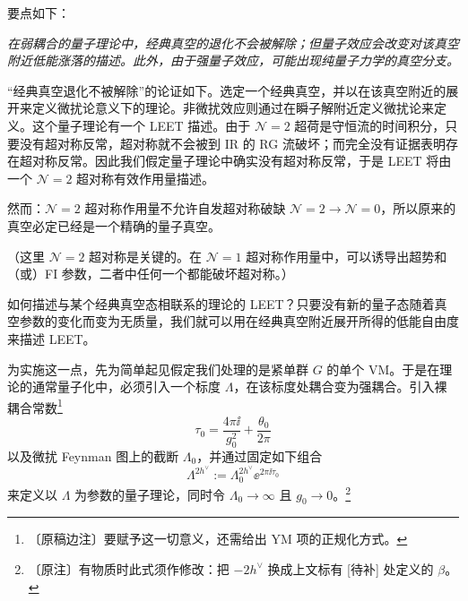 要点如下：

\smallskip
\noindent\emph{在弱耦合的量子理论中，经典真空的退化不会被解除；但量子效应会改变对该真空附近低能涨落的描述。此外，由于强量子效应，可能出现纯量子力学的真空分支。}
\smallskip

“经典真空退化不被解除”的论证如下。选定一个经典真空，并以在该真空附近的展开来定义微扰论意义下的理论。非微扰效应则通过在瞬子解附近定义微扰论来定义。这个量子理论有一个 LEET 描述。由于 $\mathcal{N}=2$ 超荷是守恒流的时间积分，只要没有超对称反常，超对称就不会被到 IR 的 RG 流破坏；而完全没有证据表明存在超对称反常。因此我们假定量子理论中确实没有超对称反常，于是 LEET 将由一个 $\mathcal{N}=2$ 超对称有效作用量描述。

然而：$\mathcal{N}=2$ 超对称作用量不允许自发超对称破缺 $\mathcal{N}=2\to\mathcal{N}=0$，所以原来的真空必定已经是一个精确的量子真空。

（这里 $\mathcal{N}=2$ 超对称是关键的。在 $\mathcal{N}=1$ 超对称作用量中，可以诱导出超势和（或）FI 参数，二者中任何一个都能破坏超对称。）

如何描述与某个经典真空态相联系的理论的 LEET？只要没有新的量子态随着真空参数的变化而变为无质量，我们就可以用在经典真空附近展开所得的低能自由度来描述 LEET。

为实施这一点，先为简单起见假定我们处理的是紧单群 $G$ 的单个 VM。于是在理论的通常量子化中，必须引入一个标度 $\Lambda$，在该标度处耦合变为强耦合。引入裸耦合常数\footnote{〔原稿边注〕要赋予这一切意义，还需给出 YM 项的正规化方式。}
\begin{equation}
\tau_{0}=\frac{4\pi\ii}{g_{0}^{2}}+\frac{\theta_{0}}{2\pi}
\tag{5.17}
\end{equation}
以及微扰 Feynman 图上的截断 $\Lambda_{0}$，并通过固定如下组合
\begin{equation}
\Lambda^{2h^{\vee}}:=\Lambda_{0}^{2h^{\vee}}\ee^{2\pi\ii\tau_{0}}
\tag{5.18}
\end{equation}
来定义以 $\Lambda$ 为参数的量子理论，同时令 $\Lambda_{0}\to\infty$ 且 $g_{0}\to0$。\footnote{〔原注〕有物质时此式须作修改：把 $-2h^{\vee}$ 换成上文标有 [待补] 处定义的 $\beta$。}



